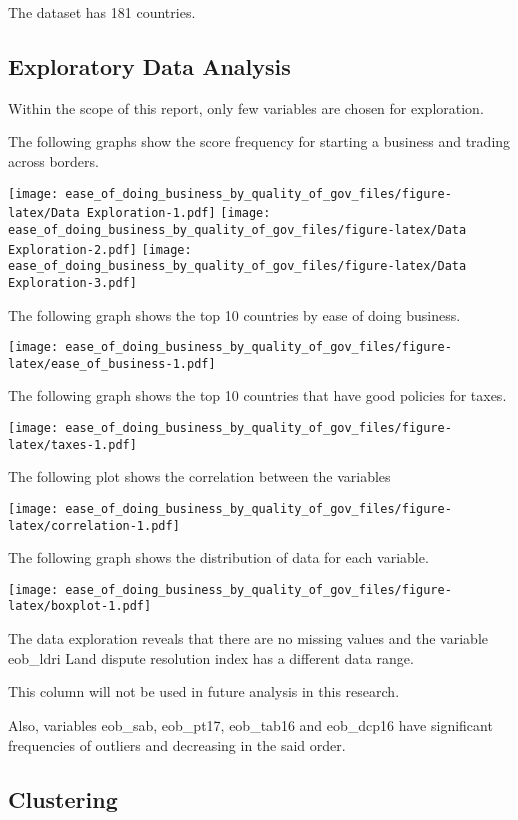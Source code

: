 \documentclass[
]{article}
\begin{document}
The dataset has 181 countries.

\hypertarget{exploratory-data-analysis}{%
\subsection{Exploratory Data Analysis}\label{exploratory-data-analysis}}

Within the scope of this report, only few variables are chosen for
exploration.

The following graphs show the score frequency for starting a business
and trading across borders.

\texttt{[image: ease\_of\_doing\_business\_by\_quality\_of\_gov\_files/figure-latex/Data Exploration-1.pdf]}
\texttt{[image: ease\_of\_doing\_business\_by\_quality\_of\_gov\_files/figure-latex/Data Exploration-2.pdf]}
\texttt{[image: ease\_of\_doing\_business\_by\_quality\_of\_gov\_files/figure-latex/Data Exploration-3.pdf]}

The following graph shows the top 10 countries by ease of doing
business.

\texttt{[image: ease\_of\_doing\_business\_by\_quality\_of\_gov\_files/figure-latex/ease\_of\_business-1.pdf]}

The following graph shows the top 10 countries that have good policies
for taxes.

\texttt{[image: ease\_of\_doing\_business\_by\_quality\_of\_gov\_files/figure-latex/taxes-1.pdf]}

The following plot shows the correlation between the variables

\texttt{[image: ease\_of\_doing\_business\_by\_quality\_of\_gov\_files/figure-latex/correlation-1.pdf]}

The following graph shows the distribution of data for each variable.

\texttt{[image: ease\_of\_doing\_business\_by\_quality\_of\_gov\_files/figure-latex/boxplot-1.pdf]}

The data exploration reveals that there are no missing values and the
variable eob\_ldri Land dispute resolution index has a different data
range.

This column will not be used in future analysis in this research.

Also, variables eob\_sab, eob\_pt17, eob\_tab16 and eob\_dcp16 have
significant frequencies of outliers and decreasing in the said order.

\hypertarget{clustering}{%
\subsection{Clustering}\label{clustering}}
\end{document}
